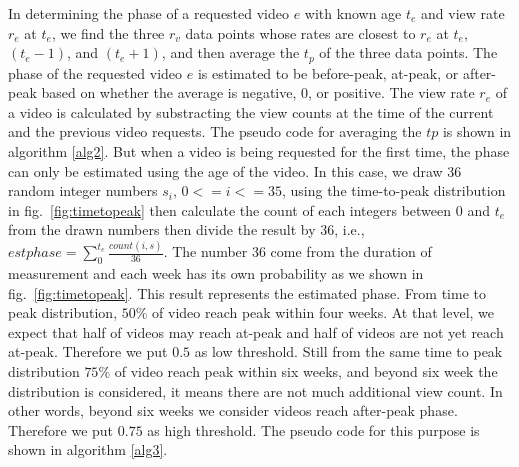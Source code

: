In determining the phase of a requested video $e$ with known age $t_e$ and view rate $r_e$ at $t_e$, we find the three $r_v$ data points whose rates are closest to $r_e$ at $t_e$, $(t_e - 1)$, and $(t_e + 1)$, and then average the $t_p$ of the three data points.
The phase of the requested video $e$ is estimated to be before-peak, at-peak, or after-peak based on whether the average is negative, $0$, or positive.
The view rate $r_e$ of a video is calculated by substracting the view counts at the time of the current and the previous video requests.
The pseudo code for averaging the $tp$ is shown in algorithm \ref{alg2}.
But when a video is being requested for the first time, the phase can only be estimated using the age of the video.
In this case, we draw 36 random integer numbers $s_i$, $0 <= i <= 35$,  using the time-to-peak distribution in fig.~\ref{fig:timetopeak} then calculate the count of each integers between $0$ and $t_e$ from the drawn numbers then divide the result by 36, 
i.e., $estphase = \sum_{0}^{t_e} \frac{count(i,s)}{36}$.
The number 36 come from the duration of measurement and each week has its own probability as we shown in fig.~\ref{fig:timetopeak}.
This result represents the estimated phase. 
From time to peak distribution, $50\%$ of video reach peak within four weeks. 
At that level, we expect that half of videos may reach at-peak and half of videos are not yet reach at-peak.
Therefore we put $0.5$ as low threshold.  
Still from the same time to peak distribution $75\%$ of video reach peak within six weeks, and beyond six week the distribution is considered, it means there are not much additional view count. 
In other words, beyond six weeks we consider videos reach after-peak phase. 
Therefore we put $0.75$ as high threshold.
The pseudo code for this purpose is shown in algorithm \ref{alg3}.


